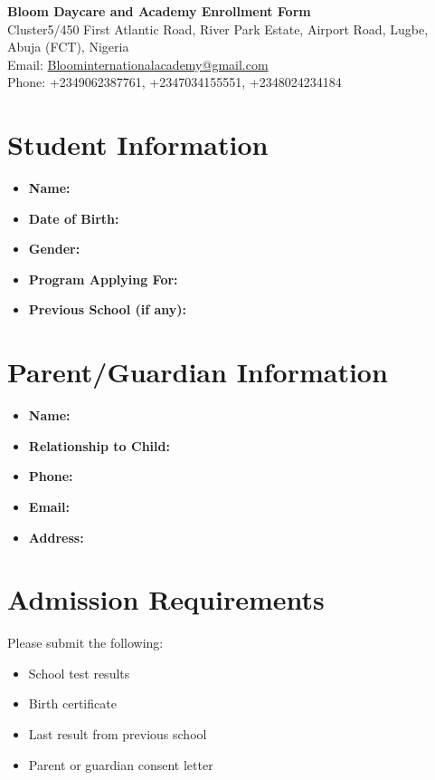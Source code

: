 \documentclass[a4paper,12pt]{article}
\begin{document}
\begin{center}
    {\LARGE \textbf{Bloom Daycare and Academy Enrollment Form}} \\
    \vspace{0.5cm}
    {\large Cluster5/450 First Atlantic Road, River Park Estate, Airport Road, Lugbe, Abuja (FCT), Nigeria} \\
    {\large Email: \href{mailto:Bloominternationalacademy@gmail.com}{Bloominternationalacademy@gmail.com}} \\
    \vspace{0.3cm}
    {\large Phone: +2349062387761, +2347034155551, +2348024234184}
\end{center}

\vspace{1cm}

\section*{Student Information}
\begin{itemize}[leftmargin=*,label={}]
    \item \textbf{Name:} \hrulefill
    \item \textbf{Date of Birth:} \hrulefill
    \item \textbf{Gender:} \hrulefill
    \item \textbf{Program Applying For:} \hrulefill
    \item \textbf{Previous School (if any):} \hrulefill
\end{itemize}

\section*{Parent/Guardian Information}
\begin{itemize}[leftmargin=*,label={}]
    \item \textbf{Name:} \hrulefill
    \item \textbf{Relationship to Child:} \hrulefill
    \item \textbf{Phone:} \hrulefill
    \item \textbf{Email:} \hrulefill
    \item \textbf{Address:} \hrulefill
\end{itemize}

\section*{Admission Requirements}
Please submit the following:
\begin{itemize}
    \item School test results
    \item Birth certificate
    \item Last result from previous school
    \item Parent or guardian consent letter
\end{itemize}
\end{document}
